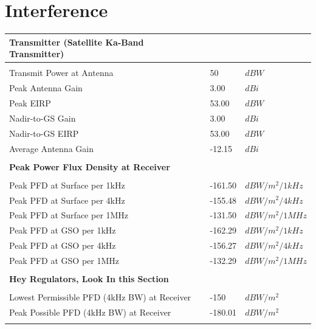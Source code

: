 \documentclass{article}
\begin{document}
\section{Interference}
\label{section::interference}
\begin{center}
  \begin{tabular}{p{3in}p{1in}l}
\textbf{Transmitter (Satellite Ka-Band Transmitter)} & & \\
\hline \\
Transmit Power at Antenna & 50 & $dBW$ \\
Peak Antenna Gain & 3.00 & $dBi$ \\
Peak EIRP & 53.00 & $dBW$ \\
Nadir-to-GS Gain & 3.00 & $dBi$ \\
Nadir-to-GS EIRP & 53.00 & $dBW$ \\
Average Antenna Gain & -12.15 & $dBi$ \\
\\
\textbf{Peak Power Flux Density at Receiver} & & \\
\hline \\
Peak PFD at Surface per 1kHz & -161.50 & $dBW/m^2/1kHz$ \\
Peak PFD at Surface per 4kHz & -155.48 & $dBW/m^2/4kHz$ \\
Peak PFD at Surface per 1MHz & -131.50 & $dBW/m^2/1MHz$ \\
Peak PFD at GSO per 1kHz & -162.29 & $dBW/m^2/1kHz$ \\
Peak PFD at GSO per 4kHz & -156.27 & $dBW/m^2/4kHz$ \\
Peak PFD at GSO per 1MHz & -132.29 & $dBW/m^2/1MHz$ \\
\\
\textbf{Hey Regulators, Look In this Section} & & \\
\hline \\
Lowest Permissible PFD (4kHz BW) at Receiver & -150 & $dBW/m^2$ \\
Peak Possible PFD (4kHz BW) at Receiver & -180.01 & $dBW/m^2$ \\
\\
\end{tabular}

  
\end{center}


\newpage
\end{document}
